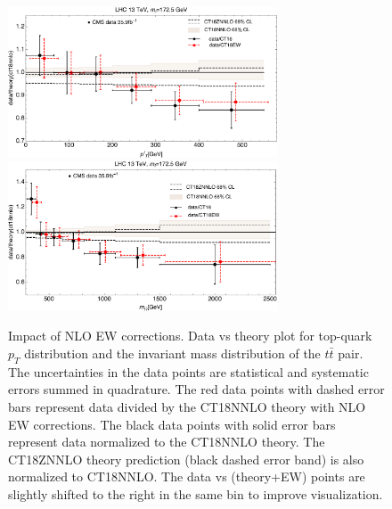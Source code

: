 %

\begin{figure}
\begin{center}
\includegraphics[width=8cm]{./fig/ttbar/CMS13-pt-top-qcdnnloewnlo-ct18nnlo-mt172p5_ect.pdf}
\includegraphics[width=8cm]{./fig/ttbar/CMS13-mtt-qcdnnloewnlo-ct18nnlo-mt172p5_ect.pdf}
\caption{Impact of NLO EW corrections. Data vs theory plot for top-quark $p_T$ distribution and the invariant mass distribution of the $t\bar{t}$ pair. 
The uncertainties in the data points are statistical and systematic errors summed in quadrature. The red data points with dashed error bars represent data divided by the CT18NNLO theory with NLO EW corrections. The black data points with solid error bars represent data normalized to the CT18NNLO theory. The CT18ZNNLO theory prediction (black dashed error band) is also normalized to CT18NNLO. The data vs (theory+EW) points are slightly shifted to the right in the same bin to improve visualization.}
\label{MttEW}
\end{center}
\end{figure}
%

